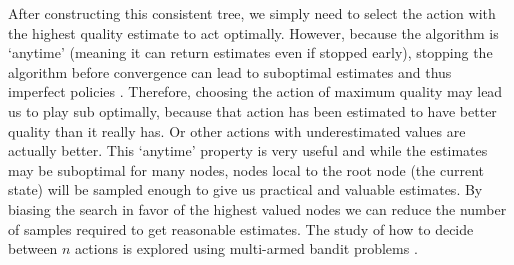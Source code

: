 \documentclass[msc, ai, twoside, notimes, logo, parskip, leftchapter, normalheadings]{infthesis}
\begin{document}
After constructing this consistent tree, we simply need to select the action with the highest quality estimate to act optimally. However, because the algorithm is `anytime' (meaning it can return estimates even if stopped early), stopping the algorithm before convergence can lead to suboptimal estimates and thus imperfect policies \citep{Gelly}. Therefore, choosing the action of maximum quality may lead us to play sub optimally, because that action has been estimated to have better quality than it really has. Or other actions with underestimated values are actually better. This `anytime' property is very useful and while the estimates may be suboptimal for many nodes, nodes local to the root node (the current state) will be sampled enough to give us practical and valuable estimates. By biasing the search in favor of the highest valued nodes we can reduce the number of samples required to get reasonable estimates. The study of how to decide between \(n\) actions is explored using multi-armed bandit problems \citep{Gelly}.
\\
\\
\end{document}
